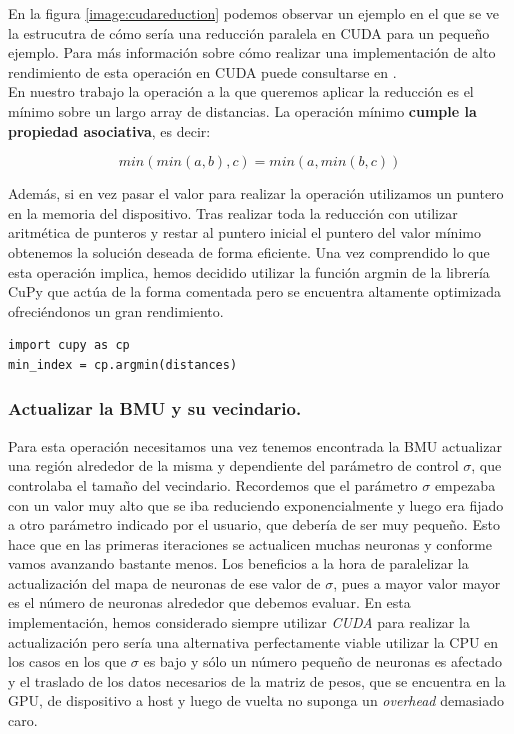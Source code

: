 En la figura \ref{image:cudareduction} podemos observar un ejemplo en el que se ve la estrucutra de cómo sería una reducción paralela en CUDA para un pequeño ejemplo. Para más información sobre cómo realizar una implementación de alto rendimiento de esta operación en CUDA puede consultarse en \cite{reduction}.\\

En nuestro trabajo la operación a la que queremos aplicar la reducción es el mínimo sobre un largo array de distancias. La operación mínimo \textbf{cumple la propiedad asociativa}, es decir:

$$min(min(a,b), c) = min(a, min(b, c))
$$

Además, si en vez pasar el valor para realizar la operación utilizamos un puntero en la memoria del dispositivo. Tras realizar toda la reducción con utilizar aritmética de punteros y restar al puntero inicial el puntero del valor mínimo obtenemos la solución deseada de forma eficiente. Una vez comprendido lo que esta operación implica, hemos decidido utilizar la función argmin de la librería CuPy que actúa de la forma comentada pero se encuentra altamente optimizada ofreciéndonos un gran rendimiento.

\begin{code}
\begin{verbatim}
import cupy as cp
min_index = cp.argmin(distances)
\end{verbatim}
\label{code:cupyreduce}
\end{code}


\subsubsection{Actualizar la BMU y su vecindario.}
Para esta operación necesitamos una vez tenemos encontrada la BMU actualizar una región alrededor de la misma y dependiente del parámetro de control $\sigma$, que controlaba el tamaño del vecindario. Recordemos que el parámetro $\sigma$ empezaba con un valor muy alto que se iba reduciendo exponencialmente y luego era fijado a otro parámetro indicado por el usuario, que debería de ser muy pequeño. Esto hace que en las primeras iteraciones se actualicen muchas neuronas y conforme vamos avanzando bastante menos. Los beneficios a la hora de paralelizar la actualización del mapa de neuronas de ese valor de $\sigma$, pues a mayor valor mayor es el número de neuronas alrededor que debemos evaluar. En esta implementación, hemos considerado siempre utilizar \textit{CUDA} para realizar la actualización pero sería una alternativa perfectamente viable utilizar la CPU en los casos en los que $\sigma$ es bajo y sólo un número pequeño de neuronas es afectado y el traslado de los datos necesarios de la matriz de pesos, que se encuentra en la GPU, de dispositivo a host y luego de vuelta no suponga un \textit{overhead} demasiado caro.\\

